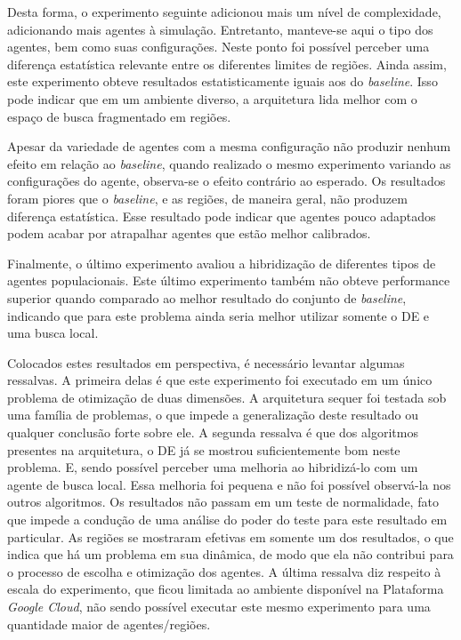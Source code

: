 Desta forma, o experimento seguinte adicionou mais um nível de complexidade, adicionando mais agentes à simulação. Entretanto, manteve-se aqui o tipo dos agentes, bem como suas configurações. Neste ponto foi possível perceber uma diferença estatística relevante entre os diferentes limites de regiões. Ainda assim, este experimento obteve resultados estatisticamente iguais aos do \textit{baseline}. Isso pode indicar que em um ambiente diverso, a arquitetura lida melhor com o espaço de busca fragmentado em regiões. 

Apesar da variedade de agentes com a mesma configuração não produzir nenhum efeito em relação ao \textit{baseline}, quando realizado o mesmo experimento variando as configurações do agente, observa-se o efeito contrário ao esperado. Os resultados foram piores que o \textit{baseline}, e as regiões, de maneira geral, não produzem diferença estatística. Esse resultado pode indicar que agentes pouco adaptados podem acabar por atrapalhar agentes que estão melhor calibrados. 

Finalmente, o último experimento avaliou a hibridização de diferentes tipos de agentes populacionais. Este último experimento também não obteve performance superior quando comparado ao melhor resultado do conjunto de \textit{baseline}, indicando que para este problema ainda seria melhor utilizar somente o DE e uma busca local.

Colocados estes resultados em perspectiva, é necessário levantar algumas ressalvas. A primeira delas é que este experimento foi executado em um único problema de otimização de duas dimensões. A arquitetura sequer foi testada sob uma família de problemas, o que impede a generalização deste resultado ou qualquer conclusão forte sobre ele. A segunda ressalva é que dos algoritmos presentes na arquitetura, o DE já se mostrou suficientemente bom neste problema. E, sendo possível perceber uma melhoria ao hibridizá-lo com um agente de busca local. Essa melhoria foi pequena e não foi possível observá-la nos outros algoritmos. Os resultados não passam em um teste de normalidade, fato que impede a condução de uma análise do poder do teste para este resultado em particular. As regiões se mostraram efetivas em somente um dos resultados, o que indica que há um problema em sua dinâmica, de modo que ela não contribui para o processo de escolha e otimização dos agentes. A última ressalva diz respeito à escala do experimento, que ficou limitada ao ambiente disponível na Plataforma \textit{Google Cloud}, não sendo possível executar este mesmo experimento para uma quantidade maior de agentes/regiões.

